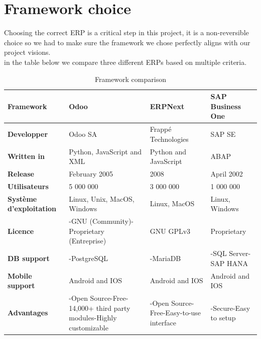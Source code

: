    
    
    
    
\section{Framework choice}
Choosing the correct ERP is a critical step in this project, it is a non-reversible choice so we had to make sure the framework we chose perfectly aligns with our project visions.\\
in the table below we compare three different ERPs based on multiple criteria.
       \begin{table}[H]
\caption{ Framework comparison }
\begin{tabular}{|p{3cm}|p{}|p{}|p{}|}
\hline
\textbf{Framework}  &\textbf{Odoo}&\textbf{ERPNext}&\textbf{SAP Business One} \\
\hline
\textbf{Developper} & Odoo SA  & Frappé Technologies & SAP SE  \\
\hline
\textbf{Written in} &
Python, JavaScript and XML & Python and JavaScript & ABAP  \\
\hline
\textbf{Release} &
February 2005 & 2008 & April 2002  \\
\hline

\textbf{Utilisateurs} &
5 000 000 & 3 000 000 & 1 000 000  \\
\hline

\textbf{Système
d'exploitation} &
Linux, Unix, MacOS,
Windows &
Linux, MacOS  &
Linux, Windows
\\

\hline

\textbf{Licence} &
-GNU (Community)\newline{}-Proprietary
(Entreprise) & GNU GPLv3  & Proprietary\\
\hline
\textbf{DB support} & 
-PostgreSQL & -MariaDB & -SQL Server\newline{}-SAP HANA  \\
\hline
\textbf{Mobile support} &
Android and IOS & Android and IOS & Android and IOS\\
\hline
\textbf{Advantages} & 
\newline{}-Open Source\newline{}-Free\newline{}- 14,000+ third party modules\newline{}-Highly customizable
 & \newline{}-Open Source\newline{}-Free\newline{}-Easy-to-use interface
 & \newline{}-Secure\newline{}-Easy to setup\\
\hline



\end{tabular}
\end{table}
